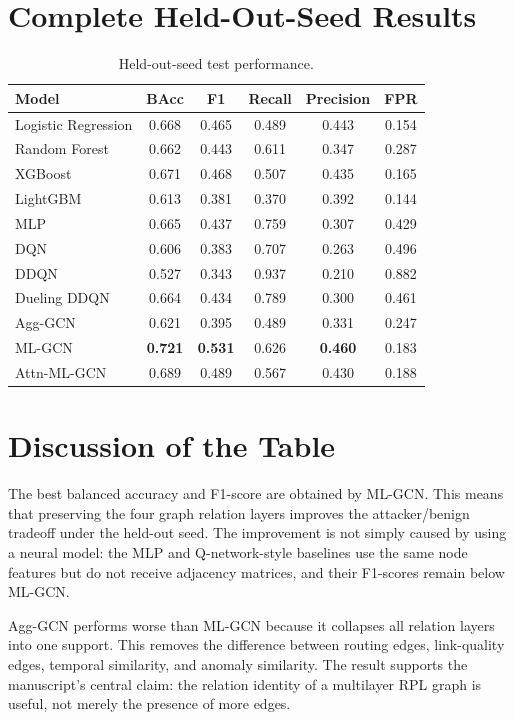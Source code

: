 \documentclass[10pt]{article}
\begin{document}
\section{Complete Held-Out-Seed Results}
\begin{table}[H]
\centering
\caption{Held-out-seed test performance.}
\small
\begin{tabular}{lccccc}
\toprule
Model & BAcc & F1 & Recall & Precision & FPR\\
\midrule
Logistic Regression & 0.668 & 0.465 & 0.489 & 0.443 & 0.154\\
Random Forest & 0.662 & 0.443 & 0.611 & 0.347 & 0.287\\
XGBoost & 0.671 & 0.468 & 0.507 & 0.435 & 0.165\\
LightGBM & 0.613 & 0.381 & 0.370 & 0.392 & 0.144\\
MLP & 0.665 & 0.437 & 0.759 & 0.307 & 0.429\\
DQN & 0.606 & 0.383 & 0.707 & 0.263 & 0.496\\
DDQN & 0.527 & 0.343 & 0.937 & 0.210 & 0.882\\
Dueling DDQN & 0.664 & 0.434 & 0.789 & 0.300 & 0.461\\
Agg-GCN & 0.621 & 0.395 & 0.489 & 0.331 & 0.247\\
ML-GCN & \textbf{0.721} & \textbf{0.531} & 0.626 & \textbf{0.460} & 0.183\\
Attn-ML-GCN & 0.689 & 0.489 & 0.567 & 0.430 & 0.188\\
\bottomrule
\end{tabular}
\end{table}

\section{Discussion of the Table}
The best balanced accuracy and F1-score are obtained by ML-GCN. This means that preserving the four graph relation layers improves the attacker/benign tradeoff under the held-out seed. The improvement is not simply caused by using a neural model: the MLP and Q-network-style baselines use the same node features but do not receive adjacency matrices, and their F1-scores remain below ML-GCN.

Agg-GCN performs worse than ML-GCN because it collapses all relation layers into one support. This removes the difference between routing edges, link-quality edges, temporal similarity, and anomaly similarity. The result supports the manuscript's central claim: the relation identity of a multilayer RPL graph is useful, not merely the presence of more edges.
\end{document}

